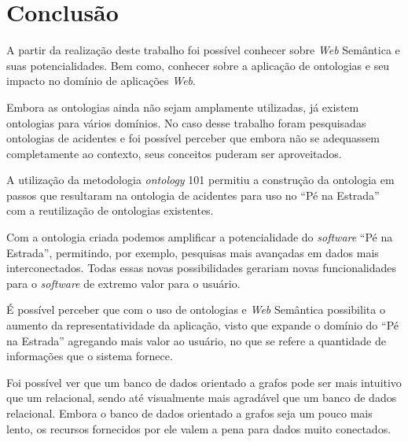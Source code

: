 \chapter{Conclusão}

A partir da realização deste trabalho foi possível conhecer sobre \textit{Web} Semântica e suas potencialidades. 
Bem como, conhecer sobre a aplicação de ontologias e seu impacto no domínio de aplicações \textit{Web}.

Embora as ontologias ainda não sejam amplamente utilizadas, já existem ontologias para vários domínios. No caso
desse trabalho foram pesquisadas ontologias de acidentes e foi possível perceber que embora não se adequassem
completamente ao contexto, seus conceitos puderam ser aproveitados.

A utilização da metodologia \textit{ontology} 101 permitiu a construção da ontologia em passos que resultaram na ontologia
de acidentes para uso no ``Pé na Estrada'' com a reutilização de ontologias existentes.

Com a ontologia criada podemos amplificar a potencialidade do \textit{software} ``Pé na Estrada'', permitindo, por exemplo,
pesquisas mais avançadas em dados mais interconectados.
Todas essas novas possibilidades gerariam novas funcionalidades
para o \textit{software} de extremo valor para o usuário.

É possível perceber que com o uso de ontologias e \textit{Web} Semântica possibilita o aumento da representatividade
da aplicação, visto que expande o domínio do ``Pé na Estrada'' agregando mais valor ao usuário, no que se refere a quantidade
de informações que o sistema fornece.

Foi possível ver que um banco de dados orientado a grafos pode ser mais intuitivo que um relacional, sendo até visualmente 
mais agradável que um banco de dados relacional. Embora o banco de dados orientado a grafos seja um pouco mais lento, os recursos
fornecidos por ele valem a pena para dados muito conectados.
